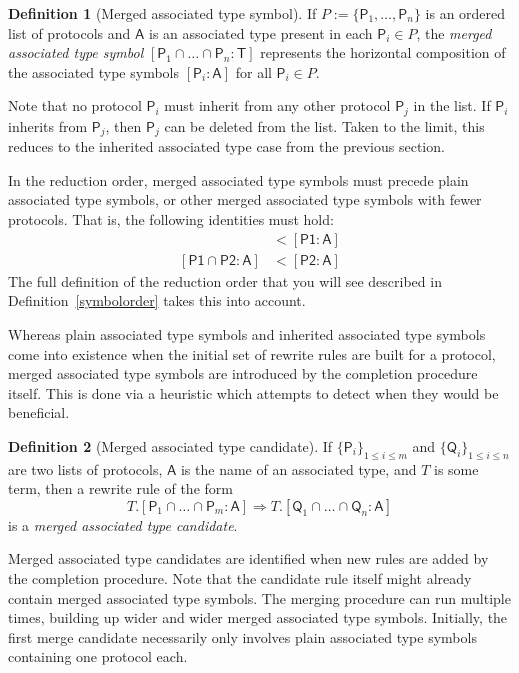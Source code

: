 \documentclass[headsepline,bibliography=totoc]{scrreport}
\newcommand{\namesym}[1]{\mathsf{#1}}
\newcommand{\proto}[1]{\bm{\mathsf{#1}}}
\newcommand{\assocsym}[2]{[\proto{#1}\colon\namesym{#2}]}
\theoremstyle{definition}
\theoremstyle{definition}
\newtheorem{definition}{Definition}[chapter]
\theoremstyle{definition}
\begin{document}
\begin{definition}[Merged associated type symbol]
If $P:=\{\proto{P}_1,\ldots,\proto{P}_n\}$ is an ordered list of protocols and $\namesym{A}$ is an associated type present in each $\proto{P}_i\in P$, the \emph{merged associated type symbol} $[\proto{P}_1\cap\ldots\cap\proto{P}_n\colon\namesym{T}]$ represents the horizontal composition of the associated type symbols $[\proto{P}_i\colon\namesym{A}]$ for all $\proto{P}_i\in P$.

Note that no protocol $\proto{P}_i$ must inherit from any other protocol $\proto{P}_j$ in the list. If $\proto{P}_i$ inherits from $\proto{P}_j$, then $\proto{P}_j$ can be deleted from the list. Taken to the limit, this reduces to the inherited associated type case from the previous section.
\end{definition}

In the reduction order, merged associated type symbols must precede plain associated type symbols, or other merged associated type symbols with fewer protocols. That is, the following identities must hold:
\begin{align*}
[\proto{P1}\cap\proto{P2}\colon\namesym{A}]&<\assocsym{P1}{A}\\
[\proto{P1}\cap\proto{P2}\colon\namesym{A}]&<\assocsym{P2}{A}
\end{align*}
The full definition of the reduction order that you will see described in Definition~\ref{symbolorder} takes this into account.

Whereas plain associated type symbols and inherited associated type symbols come into existence when the initial set of rewrite rules are built for a protocol, merged associated type symbols are introduced by the completion procedure itself. This is done via a heuristic which attempts to detect when they would be beneficial.

\begin{definition}[Merged associated type candidate] If $\{\proto{P}_i\}_{1\leq i\leq m}$ and $\{\proto{Q}_i\}_{1\leq i\leq n}$ are two lists of protocols, $\namesym{A}$ is the name of an associated type, and $T$ is some term, then a rewrite rule of the form
\[T.[\proto{P}_1\cap\ldots\cap\proto{P}_m\colon\namesym{A}] \Rightarrow T.[\proto{Q}_1\cap\ldots\cap\proto{Q}_n\colon\namesym{A}]\]
is a \emph{merged associated type candidate}.
\end{definition}

Merged associated type candidates are identified when new rules are added by the completion procedure. Note that the candidate rule itself might already contain merged associated type symbols. The merging procedure can run multiple times, building up wider and wider merged associated type symbols. Initially, the first merge candidate necessarily only involves plain associated type symbols containing one protocol each.
\end{document}
